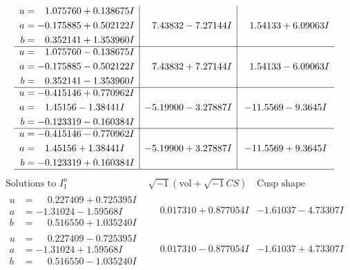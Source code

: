 \documentclass[1p]{elsarticle_modified}
\theoremstyle{definition}
\newcommand{\I}{\sqrt{-1}}
\begin{document}
$$\begin{array}{c|c|c}
\begin{aligned}
u &= \phantom{-}1.075760 + 0.138675 I \\
a &= -0.175885 + 0.502122 I \\
b &= \phantom{-}0.352141 + 1.353960 I\end{aligned}
 & \phantom{-}7.43832 - 7.27144 I & \phantom{-}1.54133 + 6.09063 I \\ \hline\begin{aligned}
u &= \phantom{-}1.075760 - 0.138675 I \\
a &= -0.175885 - 0.502122 I \\
b &= \phantom{-}0.352141 - 1.353960 I\end{aligned}
 & \phantom{-}7.43832 + 7.27144 I & \phantom{-}1.54133 - 6.09063 I \\ \hline\begin{aligned}
u &= -0.415146 + 0.770962 I \\
a &= \phantom{-}1.45156 - 1.38441 I \\
b &= -0.123319 - 0.160384 I\end{aligned}
 & -5.19900 - 3.27887 I & -11.5569 - 9.3645 I \\ \hline\begin{aligned}
u &= -0.415146 - 0.770962 I \\
a &= \phantom{-}1.45156 + 1.38441 I \\
b &= -0.123319 + 0.160384 I\end{aligned}
 & -5.19900 + 3.27887 I & -11.5569 + 9.3645 I\\
 \hline 
 \end{array}$$\newpage$$\begin{array}{c|c|c}  
\text{Solutions to }I^u_{1}& \I (\text{vol} + \sqrt{-1}CS) & \text{Cusp shape}\\
 \hline 
\begin{aligned}
u &= \phantom{-}0.227409 + 0.725395 I \\
a &= -1.31024 - 1.59568 I \\
b &= \phantom{-}0.516550 + 1.035240 I\end{aligned}
 & \phantom{-}0.017310 + 0.877054 I & -1.61037 - 4.73307 I \\ \hline\begin{aligned}
u &= \phantom{-}0.227409 - 0.725395 I \\
a &= -1.31024 + 1.59568 I \\
b &= \phantom{-}0.516550 - 1.035240 I\end{aligned}
 & \phantom{-}0.017310 - 0.877054 I & -1.61037 + 4.73307 I \\ \hline\begin{aligned}

\end{aligned}
\end{array}$$
\end{document}
